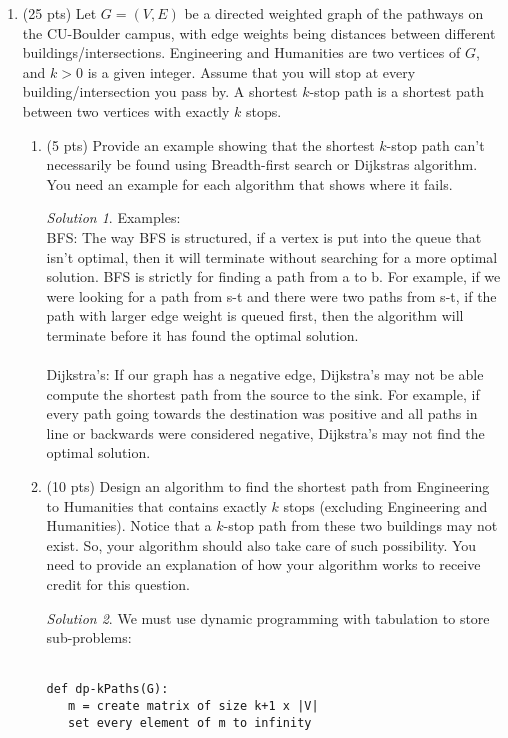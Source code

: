 \documentclass[12pt]{article}
\theoremstyle{remark}
\newtheorem*{solution}{Solution}
\begin{document}
\begin{enumerate}
\item (25 pts) Let $G=(V,E)$ be a directed weighted graph of the pathways on the CU-Boulder campus, with edge weights being distances between different buildings/intersections. Engineering and Humanities are two vertices of $G$, and $k>0$ is a given integer. Assume that you will stop at every building/intersection you pass by. A shortest $k$-stop path is a shortest path between two vertices with exactly $k$ stops.
\begin{enumerate}
    \item (5 pts) Provide an example showing that the shortest $k$-stop path can't necessarily be found using Breadth-first search or Dijkstras algorithm. You need an example for each algorithm that shows where it fails.
    \begin{solution}Examples: \\
BFS: The way BFS is structured, if a vertex is put into the queue that isn't optimal, then it will terminate without searching for a more optimal solution. BFS is strictly for finding a path from a to b. For example, if we were looking for a path from s-t and there were two paths from s-t, if the path with larger edge weight is queued first, then the algorithm will terminate before it has found the optimal solution. \\ \\
Dijkstra's: If our graph has a negative edge, Dijkstra's may not be able compute the shortest path from the source to the sink. For example, if every path going towards the destination was positive and all paths in line or backwards were considered negative, Dijkstra's may not find the optimal solution.
    \end{solution}
    \pagebreak

    \item (10 pts) Design an algorithm to find the shortest path from Engineering to Humanities that contains exactly $k$ stops (excluding Engineering and Humanities). Notice that a $k$-stop path from these two buildings may not exist. So, your algorithm should also take care of such possibility. You need to provide an explanation of how your algorithm works to receive credit for this question.
    \begin{solution}
    We must use dynamic programming with tabulation to store sub-problems: \\ \\
\begin{verbatim}
def dp-kPaths(G):
   m = create matrix of size k+1 x |V|
   set every element of m to infinity


\end{verbatim}
\end{solution}
\end{enumerate}
\end{enumerate}
\end{document}
